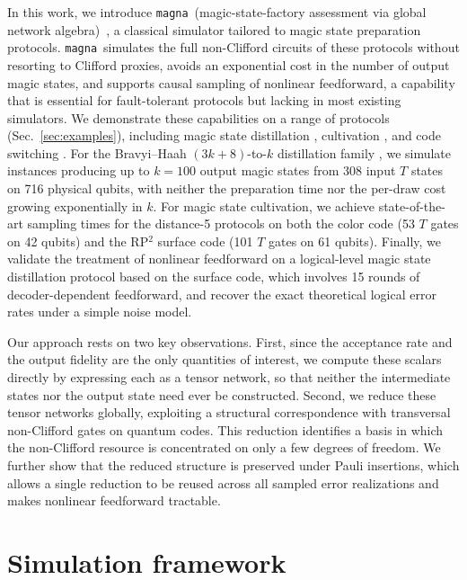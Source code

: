 \documentclass[aps,prx,twocolumn,superscriptaddress,longbibliography]{revtex4-2}
\newcommand{\simname}{\texttt{magna}}
\begin{document}
In this work, we introduce \simname\ 
(magic-state-factory assessment via global network algebra)~\cite{magna}, a classical simulator tailored to magic state preparation protocols. 
\simname\ simulates the full non-Clifford circuits of these protocols 
without resorting to Clifford proxies, 
avoids an exponential cost in the number of output magic states, 
and supports causal sampling of nonlinear feedforward, 
a capability that is essential for fault-tolerant protocols 
but lacking in most existing simulators. 
We demonstrate these capabilities on a range of protocols (Sec.~\ref{sec:examples}), 
including magic state distillation \cite{bravyiMagicStateDistillation2012}, 
cultivation \cite{gidneyMagicStateCultivation2024,chenEfficientMagicState2025}, 
and code switching \cite{daguerreCodeSwitchingRevisited2025,wangNonCliffordQuantumGate2026}. 
For the Bravyi--Haah $(3k+8)$-to-$k$ distillation family \cite{bravyiMagicStateDistillation2012}, 
we simulate instances producing up to $k=100$ output magic states 
from 308 input $T$ states on 716 physical qubits, 
with neither the preparation time nor the per-draw cost growing exponentially in $k$. 
For magic state cultivation, we achieve state-of-the-art sampling times 
for the distance-5 protocols on both the color code (53 $T$ gates on 42 qubits) 
and the RP$^2$ surface code (101 $T$ gates on 61 qubits). 
Finally, we validate the treatment of nonlinear feedforward 
on a logical-level magic state distillation protocol based on the surface code, 
which involves 15 rounds of decoder-dependent feedforward, 
and recover the exact theoretical logical error rates under a simple noise model.

Our approach rests on two key observations. 
First, since the acceptance rate and the output fidelity are the only quantities of interest, 
we compute these scalars directly by expressing each as a tensor network, 
so that neither the intermediate states nor the output state need ever be constructed. 
Second, we reduce these tensor networks globally, 
exploiting a structural correspondence with transversal non-Clifford gates on quantum codes. 
This reduction identifies a basis in which the non-Clifford resource 
is concentrated on only a few degrees of freedom. 
We further show that the reduced structure is preserved under Pauli insertions, 
which allows a single reduction to be reused across all sampled error realizations 
and makes nonlinear feedforward tractable.



\section{Simulation framework}\label{sec:algorithm}
\end{document}
